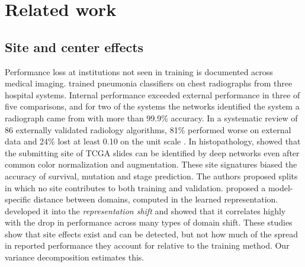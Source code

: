 \section{Related work}
\label{sec:related}

\subsection{Site and center effects}
\label{sec:related-site}

Performance loss at institutions not seen in training is documented across
medical imaging. \citet{zech2018variable} trained pneumonia classifiers on chest
radiographs from three hospital systems. Internal performance exceeded external
performance in three of five comparisons, and for two of the systems the
networks identified the system a radiograph came from with more than 99.9\%
accuracy. In a systematic review of 86 externally validated radiology
algorithms, 81\% performed worse on external data and 24\% lost at least 0.10
on the unit scale \citep{yu2022external}. In histopathology,
\citet{howard2021site} showed that the submitting site of TCGA slides can be
identified by deep networks even after common color normalization and
augmentation. These site signatures biased the accuracy of survival, mutation
and stage prediction. The authors proposed splits in which no site contributes
to both training and validation. \citet{stacke2019closer} proposed a
model-specific distance between domains, computed in the learned
representation. \citet{stacke2021measuring} developed it into the
\emph{representation shift} and showed that it correlates highly with the drop
in performance across many types of domain shift. These studies show that site
effects exist and can be detected, but not how much of the spread in reported
performance they account for relative to the training method. Our variance
decomposition estimates this.

